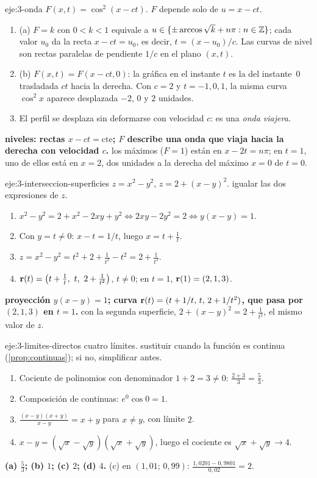 \begin{solucion}{eje:3-onda}
\datos $F(x,t)=\cos^2(x-ct)$.
\planteamiento $F$ depende solo de $u=x-ct$.
\pasos
\begin{enumerate}[label=\arabic*.]
  \item (a) $F=k$ con $0<k<1$ equivale a $u\in\{\pm\arccos\sqrt k+n\pi:n\in\mathbb{Z}\}$; cada valor $u_0$ da la recta $x-ct=u_0$, es decir, $t=(x-u_0)/c$. Las curvas de nivel son rectas paralelas de pendiente $1/c$ en el plano $(x,t)$.
  \item (b) $F(x,t)=F(x-ct,0)$: la gráfica en el instante $t$ es la del instante~0 trasladada $ct$ hacia la derecha. Con $c=2$ y $t=-1,0,1$, la misma curva $\cos^2x$ aparece desplazada $-2$, $0$ y $2$ unidades.
  \item El perfil se desplaza sin deformarse con velocidad $c$: es una \emph{onda viajera}.
\end{enumerate}
\resultado \textbf{niveles: rectas $x-ct=\text{cte}$; $F$ describe una onda que viaja hacia la derecha con velocidad $c$.}
\comprobacion los máximos ($F=1$) están en $x-2t=n\pi$; en $t=1$, uno de ellos está en $x=2$, dos unidades a la derecha del máximo $x=0$ de $t=0$.
\end{solucion}

\begin{solucion}{eje:3-interseccion-superficies}
\datos $z=x^2-y^2$, $z=2+(x-y)^2$.
\planteamiento igualar las dos expresiones de $z$.
\pasos
\begin{enumerate}[label=\arabic*.]
  \item $x^2-y^2=2+x^2-2xy+y^2\iff2xy-2y^2=2\iff y(x-y)=1$.
  \item Con $y=t\neq0$: $x-t=1/t$, luego $x=t+\frac1t$.
  \item $z=x^2-y^2=t^2+2+\frac1{t^2}-t^2=2+\frac1{t^2}$.
  \item $\vr(t)=\bigl(t+\frac1t,\ t,\ 2+\frac1{t^2}\bigr)$, $t\neq0$; en $t=1$, $\mathbf{r}(1)=(2,1,3)$.
\end{enumerate}
\resultado \textbf{proyección $y(x-y)=1$; curva $\mathbf{r}(t)=(t+1/t,\,t,\,2+1/t^2)$, que pasa por $(2,1,3)$ en $t=1$.}
\comprobacion con la segunda superficie, $2+(x-y)^2=2+\frac1{t^2}$, el mismo valor de $z$.
\end{solucion}

\begin{solucion}{eje:3-limites-directos}
\datos cuatro límites.
\planteamiento sustituir cuando la función es continua (\cref{prop:continuas}); si no, simplificar antes.
\pasos
\begin{enumerate}[label=(\alph*)]
  \item Cociente de polinomios con denominador $1+2=3\neq0$: $\frac{2+3}{3}=\frac53$.
  \item Composición de continuas: $e^0\cos0=1$.
  \item $\frac{(x-y)(x+y)}{x-y}=x+y$ para $x\neq y$, con límite $2$.
  \item $x-y=(\sqrt x-\sqrt y)(\sqrt x+\sqrt y)$, luego el cociente es $\sqrt x+\sqrt y\to4$.
\end{enumerate}
\resultado \textbf{(a) $\frac53$; (b) $1$; (c) $2$; (d) $4$.}
\comprobacion (c) en $(1{,}01;\,0{,}99)$: $\frac{1{,}0201-0{,}9801}{0{,}02}=2$.
\end{solucion}

